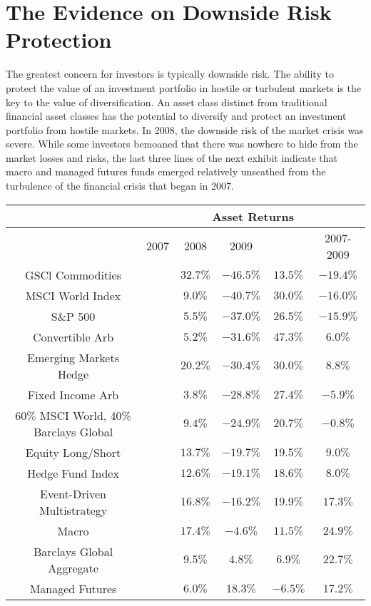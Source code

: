 \documentclass[11pt]{article}
\begin{document}
\section*{The Evidence on Downside Risk Protection}
The greatest concern for investors is typically downside risk. The ability to protect the value of an investment portfolio in hostile or turbulent markets is the key to the value of diversification. An asset class distinct from traditional financial asset classes has the potential to diversify and protect an investment portfolio from hostile markets. In 2008, the downside risk of the market crisis was severe. While some investors bemoaned that there was nowhere to hide from the market losses and risks, the last three lines of the next exhibit indicate that macro and managed futures funds emerged relatively unscathed from the turbulence of the financial crisis that began in 2007.

\begin{center}
\begin{tabular}{|c|c|c|c|c|c|}
\hline
 & \multicolumn{5}{|c|}{Asset Returns} \\
\hline
 & 2007 & 2008 & 2009 &  & 2007-2009 \\
\hline
GSCl Commodities &  & $32.7 \%$ & $-46.5 \%$ & $13.5 \%$ & $-19.4 \%$ \\
\hline
MSCI World Index &  & $9.0 \%$ & $-40.7 \%$ & $30.0 \%$ & $-16.0 \%$ \\
\hline
S\&P 500 &  & $5.5 \%$ & $-37.0 \%$ & $26.5 \%$ & $-15.9 \%$ \\
\hline
Convertible Arb &  & $5.2 \%$ & $-31.6 \%$ & $47.3 \%$ & $6.0 \%$ \\
\hline
Emerging Markets Hedge &  & $20.2 \%$ & $-30.4 \%$ & $30.0 \%$ & $8.8 \%$ \\
\hline
Fixed Income Arb &  & $3.8 \%$ & $-28.8 \%$ & $27.4 \%$ & $-5.9 \%$ \\
\hline
$60 \%$ MSCI World, 40\% Barclays Global &  & $9.4 \%$ & $-24.9 \%$ & $20.7 \%$ & $-0.8 \%$ \\
\hline
Equity Long/Short &  & $13.7 \%$ & $-19.7 \%$ & $19.5 \%$ & $9.0 \%$ \\
\hline
Hedge Fund Index &  & $12.6 \%$ & $-19.1 \%$ & $18.6 \%$ & $8.0 \%$ \\
\hline
Event-Driven Multistrategy &  & $16.8 \%$ & $-16.2 \%$ & $19.9 \%$ & $17.3 \%$ \\
\hline
Macro &  & $17.4 \%$ & $-4.6 \%$ & $11.5 \%$ & $24.9 \%$ \\
\hline
Barclays Global Aggregate &  & $9.5 \%$ & $4.8 \%$ & $6.9 \%$ & $22.7 \%$ \\
\hline
Managed Futures &  & $6.0 \%$ & $18.3 \%$ & $-6.5 \%$ & $17.2 \%$ \\
\hline
\end{tabular}
\end{center}
\end{document}
